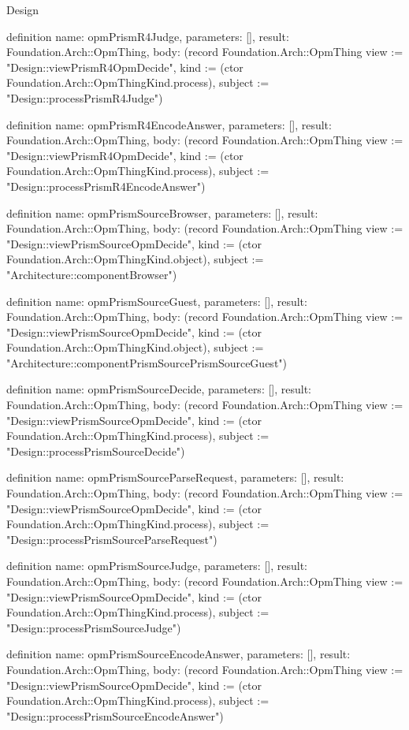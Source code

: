 \begin{lexlean}{Design}
\begin{semanticmodule}
definition{
  name: opmPrismR4Judge,
  parameters: [],
  result: Foundation.Arch::OpmThing,
  body: (record Foundation.Arch::OpmThing {view := "Design::viewPrismR4OpmDecide", kind := (ctor Foundation.Arch::OpmThingKind.process), subject := "Design::processPrismR4Judge"})
}

definition{
  name: opmPrismR4EncodeAnswer,
  parameters: [],
  result: Foundation.Arch::OpmThing,
  body: (record Foundation.Arch::OpmThing {view := "Design::viewPrismR4OpmDecide", kind := (ctor Foundation.Arch::OpmThingKind.process), subject := "Design::processPrismR4EncodeAnswer"})
}

definition{
  name: opmPrismSourceBrowser,
  parameters: [],
  result: Foundation.Arch::OpmThing,
  body: (record Foundation.Arch::OpmThing {view := "Design::viewPrismSourceOpmDecide", kind := (ctor Foundation.Arch::OpmThingKind.object), subject := "Architecture::componentBrowser"})
}

definition{
  name: opmPrismSourceGuest,
  parameters: [],
  result: Foundation.Arch::OpmThing,
  body: (record Foundation.Arch::OpmThing {view := "Design::viewPrismSourceOpmDecide", kind := (ctor Foundation.Arch::OpmThingKind.object), subject := "Architecture::componentPrismSourcePrismSourceGuest"})
}

definition{
  name: opmPrismSourceDecide,
  parameters: [],
  result: Foundation.Arch::OpmThing,
  body: (record Foundation.Arch::OpmThing {view := "Design::viewPrismSourceOpmDecide", kind := (ctor Foundation.Arch::OpmThingKind.process), subject := "Design::processPrismSourceDecide"})
}

definition{
  name: opmPrismSourceParseRequest,
  parameters: [],
  result: Foundation.Arch::OpmThing,
  body: (record Foundation.Arch::OpmThing {view := "Design::viewPrismSourceOpmDecide", kind := (ctor Foundation.Arch::OpmThingKind.process), subject := "Design::processPrismSourceParseRequest"})
}

definition{
  name: opmPrismSourceJudge,
  parameters: [],
  result: Foundation.Arch::OpmThing,
  body: (record Foundation.Arch::OpmThing {view := "Design::viewPrismSourceOpmDecide", kind := (ctor Foundation.Arch::OpmThingKind.process), subject := "Design::processPrismSourceJudge"})
}

definition{
  name: opmPrismSourceEncodeAnswer,
  parameters: [],
  result: Foundation.Arch::OpmThing,
  body: (record Foundation.Arch::OpmThing {view := "Design::viewPrismSourceOpmDecide", kind := (ctor Foundation.Arch::OpmThingKind.process), subject := "Design::processPrismSourceEncodeAnswer"})
}


\end{semanticmodule}
\end{lexlean}
